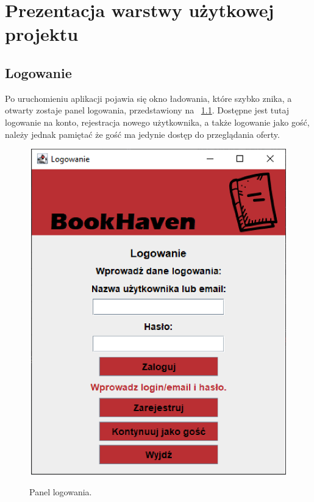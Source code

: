 \chapter{Prezentacja warstwy użytkowej projektu}
\label{cha:wartstwa uzytkowa}

\section{Logowanie}

Po uruchomieniu aplikacji pojawia się okno ładowania, które szybko znika, a otwarty zostaje panel logowania, przedstawiony na \figurename~\ref{fig10}. Dostępne jest tutaj logowanie na konto, rejestracja nowego użytkownika,
a także logowanie jako gość, należy jednak pamiętać że gość ma jedynie dostęp do przeglądania oferty.
\begin{figure}[H]
    \centering
    \includegraphics[width=\linewidth]{figures/fig_0010.eps}\\
    \caption{Panel logowania.\label{fig10}}
\end{figure}

